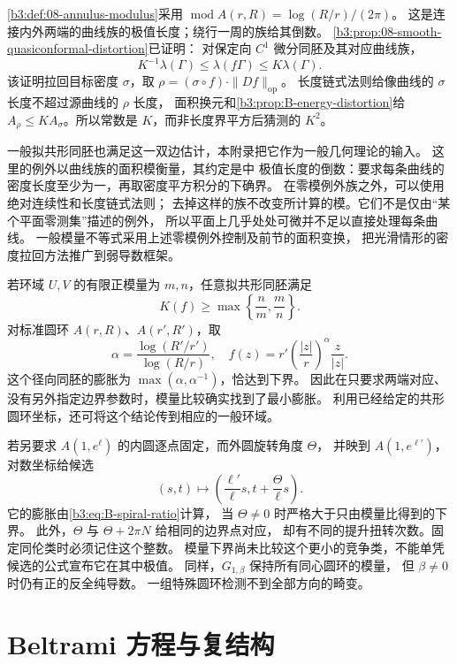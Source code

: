\cref{b3:def:08-annulus-modulus}采用
\(\operatorname{mod}A(r,R)=\log(R/r)/(2\pi)\)。
这是连接内外两端的曲线族的极值长度；绕行一周的族给其倒数。
\cref{b3:prop:08-smooth-quasiconformal-distortion}已证明：
对保定向 \(C^1\) 微分同胚及其对应曲线族，
\[
 K^{-1}\lambda(\Gamma)\le\lambda(f\Gamma)\le K\lambda(\Gamma).
\]
该证明拉回目标密度 \(\sigma\)，取
\(\rho=(\sigma\circ f)\cdot\|Df\|_{\mathrm{op}}\)。
长度链式法则给像曲线的 \(\sigma\) 长度不超过源曲线的 \(\rho\) 长度，
面积换元和\cref{b3:prop:B-energy-distortion}给
\(A_\rho\le K A_\sigma\)。所以常数是 \(K\)，而非长度界平方后猜测的 \(K^2\)。

\ProseParagraphBreak

一般拟共形同胚也满足这一双边估计，本附录把它作为一般几何理论的输入。
这里的例外以曲线族的面积模衡量，其约定是中
极值长度的倒数：要求每条曲线的密度长度至少为一，再取密度平方积分的下确界。
在零模例外族之外，可以使用绝对连续性和长度链式法则；
去掉这样的族不改变所计算的模。它们不是仅由“某个平面零测集”描述的例外，
所以平面上几乎处处可微并不足以直接处理每条曲线。
一般模量不等式采用上述零模例外控制及前节的面积变换，
把光滑情形的密度拉回方法推广到弱导数框架。

\ProseParagraphBreak

若环域 \(U,V\) 的有限正模量为 \(m,n\)，任意拟共形同胚满足
\[
 K(f)\ge\max\left\{\frac nm,\frac mn\right\}.
\]
对标准圆环 \(A(r,R)\)、\(A(r',R')\)，取
\[
 \alpha=\frac{\log(R'/r')}{\log(R/r)},\quad
 f(z)=r'\left(\frac{|z|}{r}\right)^\alpha\frac z{|z|}.
\]
这个径向同胚的膨胀为 \(\max(\alpha,\alpha^{-1})\)，恰达到下界。
因此在只要求两端对应、没有另外指定边界参数时，模量比较确实找到了最小膨胀。
利用已经给定的共形圆环坐标，还可将这个结论传到相应的一般环域。

\ProseParagraphBreak

若另要求 \(A(1,e^\ell)\) 的内圆逐点固定，而外圆旋转角度 \(\Theta\)，
并映到 \(A(1,e^{\ell'})\)，对数坐标给候选
\[
 (s,t)\longmapsto\left(\frac{\ell'}\ell s,
                              t+\frac\Theta\ell s\right).
\]
它的膨胀由\eqref{b3:eq:B-spiral-ratio}计算，
当 \(\Theta\ne0\) 时严格大于只由模量比得到的下界。
此外，\(\Theta\) 与 \(\Theta+2\pi N\) 给相同的边界点对应，
却有不同的提升扭转次数。固定同伦类时必须记住这个整数。
模量下界尚未比较这个更小的竞争类，不能单凭候选的公式宣布它在其中极值。
同样，\(G_{1,\beta}\) 保持所有同心圆环的模量，
但 \(\beta\ne0\) 时仍有正的反全纯导数。
一组特殊圆环检测不到全部方向的畸变。

\section{Beltrami 方程与复结构}
\label{b3:sec:B04}

